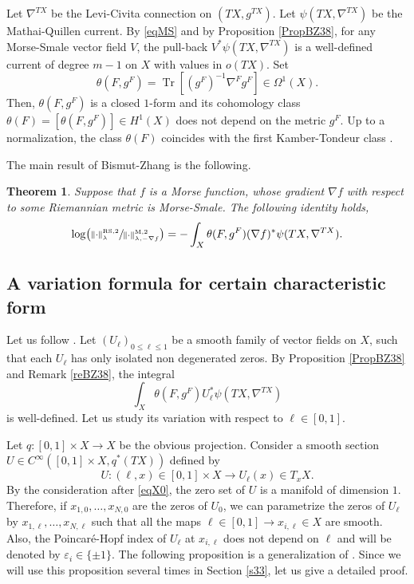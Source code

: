 \documentclass[JEP,XML,SOM,Unicode]{cedram}
\newcommand{\rM}{\mathrm{M}}
\newcommand{\RS}{\mathrm{RS}}
\theoremstyle{plain}
\newtheorem{thm}[lem]{Theorem}
\theoremstyle{definition}
\theoremstyle{remark}
\DeclareMathOperator{\Tr}{Tr}
\let\l\leqslant
\let\e\varepsilon
\begin{document}
Let $\nabla^{TX}$ be the Levi-Civita connection on $(TX,g^{TX})$. Let
$\psi(TX,\nabla^{TX})$ be the Mathai-Quillen current. By \eqref{eqMS} and by Proposition \ref{PropBZ38}, for any Morse-Smale vector field
$V$, the pull-back $V^{*}\psi(TX,\nabla^{TX})$ is a well-defined current of degree $m-1$ on $X$ with values in $o(TX)$.
Set
\begin{equation*}
\theta(F,g^{F})=\Tr[(g^{F})^{-1}\nabla^{F}g^{F}]\in
\Omega^{1}(X).
\end{equation*}
Then, $\theta(F,g^{F})$ is a closed $1$-form and its cohomology class
$\theta(F)=[\theta(F,g^{F})]\in H^{1}(X)$ does not depend on the
metric $g^F$. Up to a normalization, the class $\theta(F)$ coincides with the first Kamber-Tondeur class \cite{KamberTondeur74}.

\pagebreak[2]
The main result of Bismut-Zhang \cite[Th.\,0.2]{BZ92} is the following.

\begin{thm}\label{BZ}
Suppose that $f$ is a Morse function, whose gradient $\nabla f$ with respect to
some Riemannian metric is Morse-Smale. The following identity holds,
\begin{equation*}\label{eqBZ}
\log\bigl(\sfrac{\|{\cdot}\|^{\RS,2}_{\lambda}}{\|{\cdot}\|^{\rM,2}_{\lambda,-\nabla f}}\bigr)=-\int_{X}\theta(F,g^{F})(\nabla f)^{*}\psi(TX, \nabla ^{TX}).
\end{equation*}
\end{thm}

\subsection{A variation formula for certain characteristic
form}\label{sMa}Let us follow \cite[\S VI.a) and VI.b)]{BZ92}.
Let $(U_{\ell})_{0\l \ell\l 1}$ be a smooth family of vector fields
on $X$, such that each $U_{\ell}$ has only isolated non degenerated
zeros. By Proposition \ref{PropBZ38} and Remark \ref{reBZ38}, the integral
\begin{equation*}
\int_{X}\theta(F,g^{F})U_{\ell}^{*}\psi(TX, \nabla ^{TX})
\end{equation*}
is well-defined. Let us study its variation with respect to $\ell\in [0,1]$.

Let $q: [0,1]\times X\to X$ be the obvious projection. Consider a
smooth section $U\in C^{\infty}([0,1]\times X, q^{*}(TX))$ defined by
\begin{equation*}
U: (\ell,x)\in [0,1]\times X\to U_{\ell}(x)\in T_{x}X.
\end{equation*}
By the consideration after \eqref{eqX0}, the zero set of $U$ is a
manifold of dimension $1$.
Therefore, if $x_{1,0}, \ldots, x_{N,0}$ are the zeros of $U_{0}$,
we can parametrize the zeros of $U_{\ell}$ by
$x_{1,\ell},\ldots,x_{N,\ell}$ such that all the maps $\ell\in
[0,1]\to x_{i,\ell}\in X$ are
smooth. Also, the Poincaré-Hopf index of $U_{\ell}$ at
$x_{i,\ell}$ does not depend on $\ell$ and will be denoted by
$\e_{i}\in \{\pm1\}$. The following proposition is a generalization of \cite[Prop.\,6.4]{BZ92}. Since we will use this proposition several times in
Section \ref{s33}, let us give a detailed proof.
\end{document}
